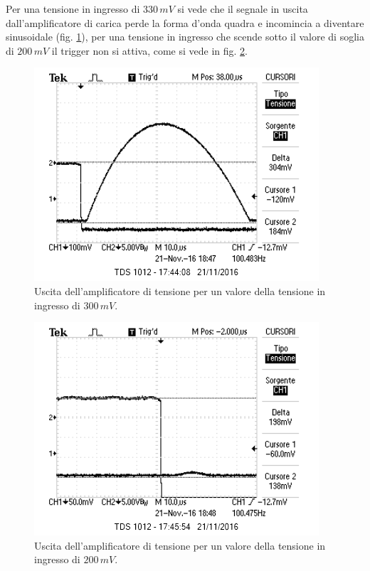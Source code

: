 \documentclass[10pt,a4paper]{article}
\begin{document}
Per una tensione in ingresso di $330 \, mV$ si vede che il segnale in uscita dall'amplificatore di carica perde la forma d'onda quadra e incomincia a diventare sinusoidale (fig. \ref{inizamorire}), per una tensione in ingresso che scende sotto il valore di soglia di $200 \, mV$ il trigger non si attiva, come si vede in fig. \ref{morto}.\\

\begin{figure}[htb!]
\centering
\includegraphics[scale=1.0]{immagini/iniziaamorire.png}
\caption{Uscita dell'amplificatore di tensione per un valore della tensione in ingresso di $300 \, mV$.}
\label{inizamorire}
\end{figure}

\begin{figure}[htb!]
\centering
\includegraphics[scale=1.0]{immagini/morto.png}
\caption{Uscita dell'amplificatore di tensione per un valore della tensione in ingresso di $200 \, mV$.}
\label{morto}
\end{figure}
\end{document}
